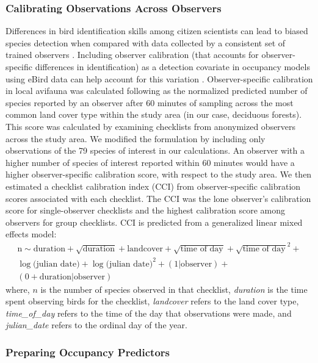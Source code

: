 \subsubsection*{Calibrating Observations Across Observers}

Differences in bird identification skills among citizen scientists can lead to biased species detection when compared with data collected by a consistent set of trained observers \citep{vanstrien2013}.
Including observer calibration (that accounts for observer-specific differences in identification) as a detection covariate in occupancy models using eBird data can help account for this variation \citep{johnston2018}.
Observer-specific calibration in local avifauna was calculated following \textcite{kelling2015c} as the normalized predicted number of species reported by an observer after 60 minutes of sampling across the most common land cover type within the study area (in our case, deciduous forests).
This score was calculated by examining checklists from anonymized observers across the study area.
We modified the \citep{kelling2015c} formulation by including only observations of the 79 species of interest in our calculations.
An observer with a higher number of species of interest reported within 60 minutes would have a higher observer-specific calibration score, with respect to the study area.
We then estimated a checklist calibration index (CCI) from observer-specific calibration scores associated with each checklist.
The CCI was the lone observer's calibration score for single-observer checklists and the highest calibration score among observers for group checklists.
CCI is predicted from a generalized linear mixed effects model:
\begin{multline*}
    \text{n} \sim \text{duration} + \sqrt{\text{duration}} + \text{landcover} + \sqrt{\text{time of day}} + \sqrt{\text{time of day}}^2 + \\ \log({\text{julian date})} + \log({\text{julian date})}^2 + (1 | \text{observer}) + \\(0 + \text{duration} | \text{observer})
\end{multline*}
where, $n$ is the number of species observed in that checklist, \textit{duration} is the time spent observing birds for the checklist, \textit{landcover} refers to the land cover type, \textit{time\_of\_day} refers to the time of the day that observations were made, and \textit{julian\_date} refers to the ordinal day of the year.

\subsubsection*{Preparing Occupancy Predictors}


